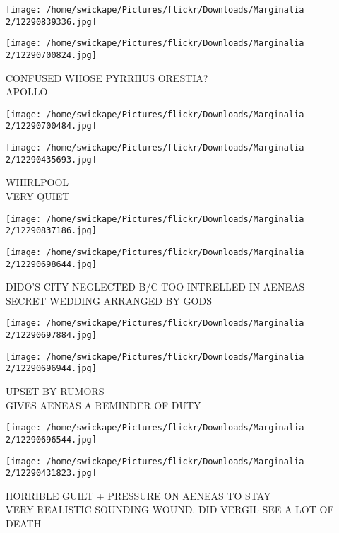 \documentclass[10pt,letterpaper]{article}
\begin{document}
\texttt{[image: /home/swickape/Pictures/flickr/Downloads/Marginalia 2/12290839336.jpg]}

\vspace{0.25in}
\texttt{[image: /home/swickape/Pictures/flickr/Downloads/Marginalia 2/12290700824.jpg]}

CONFUSED WHOSE PYRRHUS ORESTIA?\\
APOLLO\\
\pagebreak

\texttt{[image: /home/swickape/Pictures/flickr/Downloads/Marginalia 2/12290700484.jpg]}

\vspace{0.25in}
\texttt{[image: /home/swickape/Pictures/flickr/Downloads/Marginalia 2/12290435693.jpg]}

WHIRLPOOL\\
VERY QUIET\\
\pagebreak

\texttt{[image: /home/swickape/Pictures/flickr/Downloads/Marginalia 2/12290837186.jpg]}

\vspace{0.25in}
\texttt{[image: /home/swickape/Pictures/flickr/Downloads/Marginalia 2/12290698644.jpg]}

DIDO'S CITY NEGLECTED B/C TOO INTRELLED IN AENEAS\\
SECRET WEDDING ARRANGED BY GODS\\
\pagebreak

\texttt{[image: /home/swickape/Pictures/flickr/Downloads/Marginalia 2/12290697884.jpg]}

\vspace{0.25in}
\texttt{[image: /home/swickape/Pictures/flickr/Downloads/Marginalia 2/12290696944.jpg]}

UPSET BY RUMORS\\
GIVES AENEAS A REMINDER OF DUTY\\
\pagebreak

\texttt{[image: /home/swickape/Pictures/flickr/Downloads/Marginalia 2/12290696544.jpg]}

\vspace{0.25in}
\texttt{[image: /home/swickape/Pictures/flickr/Downloads/Marginalia 2/12290431823.jpg]}

HORRIBLE GUILT + PRESSURE ON AENEAS TO STAY\\
VERY REALISTIC SOUNDING WOUND.  DID VERGIL SEE A LOT OF DEATH\\
\pagebreak
\end{document}
